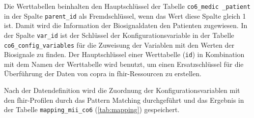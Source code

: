  Die Werttabellen beinhalten den Hauptschlüssel der Tabelle \texttt{co6\_medic \_patient} in der Spalte \texttt{parent\_id} als Fremdschlüssel, wenn das Wert diese Spalte gleich 1 ist. Damit wird die Information der Biosignaldaten den Patienten zugewiesen. In der Spalte \texttt{var\_id} ist der Schlüssel der Konfigurationsvariable in der Tabelle \texttt{co6\_config\_variables} für die Zuweisung der Variablen mit den Werten der Biosignale zu finden. Der Hauptschlüssel einer Werttabelle (\texttt{id}) in Kombination mit dem Namen der Werttabelle wird benutzt, um einen Ersatzschlüssel für die Überführung der Daten von \ac{copra} in \ac{fhir}-Ressourcen zu erstellen.

Nach der Datendefinition wird die Zuordnung der Konfigurationsvariablen mit den \ac{fhir}-Profilen durch das Pattern Matching durchgeführt und das Ergebnis in der Tabelle \texttt{mapping\_mii\_co6} (\ref{tab:mapping}) gespeichert.


